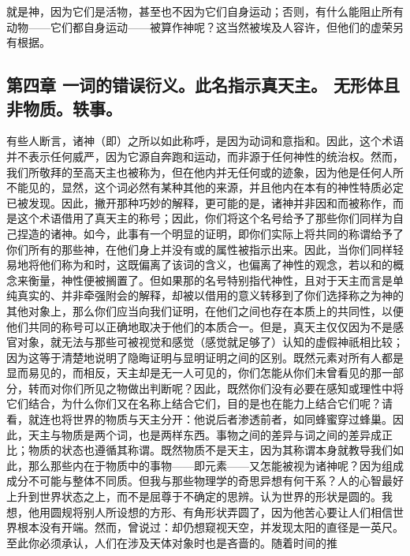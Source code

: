 就是神，因为它们是活物，甚至也不因为它们自身运动；否则，有什么能阻止所有动物——它们都自身运动——被算作神呢？这当然被埃及人容许，但他们的虚荣另有根据。\par


\subsection{第四章  一词的错误衍义。此名指示真天主。 无形体且非物质。轶事。}

有些人断言，诸神（即）之所以如此称呼，是因为动词和意指和。因此，这个术语并不表示任何威严，因为它源自奔跑和运动，而非源于任何神性的统治权。然而，我们所敬拜的至高天主也被称为，但在他内并无任何或的迹象，因为他是任何人所不能见的，显然，这个词必然有某种其他的来源，并且他内在本有的神性特质必定已被发现。因此，撇开那种巧妙的解释，更可能的是，诸神并非因和而被称作，而是这个术语借用了真天主的称号；因此，你们将这个名号给予了那些你们同样为自己捏造的诸神。如今，此事有一个明显的证明，即你们实际上将共同的称谓给予了你们所有的那些神，在他们身上并没有或的属性被指示出来。因此，当你们同样轻易地将他们称为和时，这既偏离了该词的含义，也偏离了神性的观念，若以和的概念来衡量，神性便被搁置了。但如果那的名号特别指代神性，且对于天主而言是单纯真实的、并非牵强附会的解释，却被以借用的意义转移到了你们选择称之为神的其他对象上，那么你们应当向我们证明，在他们之间也存在本质上的共同性，以便他们共同的称号可以正确地取决于他们的本质合一。但是，真天主仅仅因为不是感官对象，就无法与那些可被视觉和感觉（感觉就足够了）认知的虚假神祇相比较；因为这等于清楚地说明了隐晦证明与显明证明之间的区别。既然元素对所有人都是显而易见的，而相反，天主却是无一人可见的，你们怎能从你们未曾看见的那一部分，转而对你们所见之物做出判断呢？因此，既然你们没有必要在感知或理性中将它们结合，为什么你们又在名称上结合它们，目的是也在能力上结合它们呢？请看，就连也将世界的物质与天主分开：他说后者渗透前者，如同蜂蜜穿过蜂巢。因此，天主与物质是两个词，也是两样东西。事物之间的差异与词之间的差异成正比；物质的状态也遵循其称谓。既然物质不是天主，因为其称谓本身就教导我们如此，那么那些内在于物质中的事物——即元素——又怎能被视为诸神呢？因为组成成分不可能与整体不同质。但我与那些物理学的奇思异想有何干系？人的心智最好上升到世界状态之上，而不是屈尊于不确定的思辨。认为世界的形状是圆的。我想，他用圆规将别人所设想的方形、有角形状弄圆了，因为他苦心要让人们相信世界根本没有开端。然而，曾说过：却仍想窥视天空，并发现太阳的直径是一英尺。至此你必须承认，人们在涉及天体对象时也是吝啬的。随着时间的推